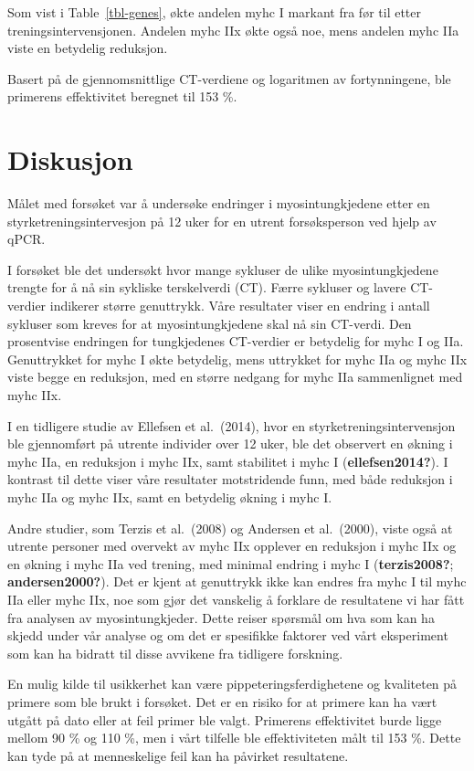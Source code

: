 \documentclass[
  letterpaper,
  DIV=11,
  numbers=noendperiod]{scrreprt}
\begin{document}
Som vist i Table~\ref{tbl-genes}, økte andelen myhc I markant fra før
til etter treningsintervensjonen. Andelen myhc IIx økte også noe, mens
andelen myhc IIa viste en betydelig reduksjon.

Basert på de gjennomsnittlige CT-verdiene og logaritmen av
fortynningene, ble primerens effektivitet beregnet til 153 \%.

\section{Diskusjon}\label{diskusjon-5}

Målet med forsøket var å undersøke endringer i myosintungkjedene etter
en styrketreningsintervesjon på 12 uker for en utrent forsøksperson ved
hjelp av qPCR.

I forsøket ble det undersøkt hvor mange sykluser de ulike
myosintungkjedene trengte for å nå sin sykliske terskelverdi (CT). Færre
sykluser og lavere CT-verdier indikerer større genuttrykk. Våre
resultater viser en endring i antall sykluser som kreves for at
myosintungkjedene skal nå sin CT-verdi. Den prosentvise endringen for
tungkjedenes CT-verdier er betydelig for myhc I og IIa. Genuttrykket for
myhc I økte betydelig, mens uttrykket for myhc IIa og myhc IIx viste
begge en reduksjon, med en større nedgang for myhc IIa sammenlignet med
myhc IIx.

I en tidligere studie av Ellefsen et al.~(2014), hvor en
styrketreningsintervensjon ble gjennomført på utrente individer over 12
uker, ble det observert en økning i myhc IIa, en reduksjon i myhc IIx,
samt stabilitet i myhc I (\textbf{ellefsen2014?}). I kontrast til dette
viser våre resultater motstridende funn, med både reduksjon i myhc IIa
og myhc IIx, samt en betydelig økning i myhc I.

Andre studier, som Terzis et al.~(2008) og Andersen et al.~(2000), viste
også at utrente personer med overvekt av myhc IIx opplever en reduksjon
i myhc IIx og en økning i myhc IIa ved trening, med minimal endring i
myhc I (\textbf{terzis2008?}; \textbf{andersen2000?}). Det er kjent at
genuttrykk ikke kan endres fra myhc I til myhc IIa eller myhc IIx, noe
som gjør det vanskelig å forklare de resultatene vi har fått fra
analysen av myosintungkjeder. Dette reiser spørsmål om hva som kan ha
skjedd under vår analyse og om det er spesifikke faktorer ved vårt
eksperiment som kan ha bidratt til disse avvikene fra tidligere
forskning.

En mulig kilde til usikkerhet kan være pippeteringsferdighetene og
kvaliteten på primere som ble brukt i forsøket. Det er en risiko for at
primere kan ha vært utgått på dato eller at feil primer ble valgt.
Primerens effektivitet burde ligge mellom 90 \% og 110 \%, men i vårt
tilfelle ble effektiviteten målt til 153 \%. Dette kan tyde på at
menneskelige feil kan ha påvirket resultatene.
\end{document}
